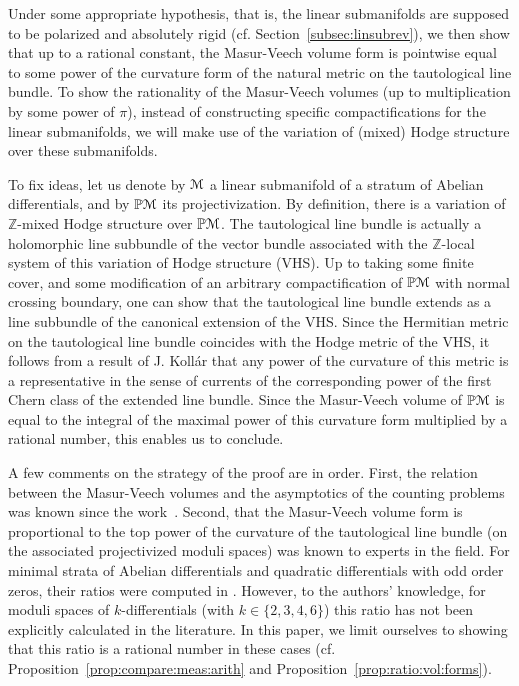 \documentclass[11pt]{article}
\newcommand{\cf}{cf.\xspace}
\numberwithin{equation}{section}
\let\mathcal\EuScript
\theoremstyle{plain}
\theoremstyle{definition}
\newcommand\Z{\mathbb{Z}}
\newcommand{\Pb}{\mathbb{P}}
\newcommand{\cM}{\mathcal{M}}
\begin{document}
Under some appropriate hypothesis, that is, the linear submanifolds are supposed to be polarized and absolutely rigid (\cf Section~\ref{subsec:linsubrev}), we then show that up to a rational constant, the Masur-Veech volume form is pointwise equal to some power of the curvature form of the natural metric on the tautological line bundle.
To show the rationality of the Masur-Veech volumes (up to multiplication by some power of $\pi$), instead of constructing specific compactifications for the linear submanifolds, we will make use of the variation of (mixed) Hodge structure over these submanifolds.

To fix ideas, let us denote by $\cM$ a linear submanifold of a stratum of Abelian differentials, and by $\Pb\cM$ its projectivization.
By definition, there is a variation of $\Z$-mixed Hodge structure over $\Pb\cM$.
The tautological line bundle is actually a holomorphic line subbundle of the vector bundle associated with the $\Z$-local system of this variation of Hodge structure (VHS).
Up to taking some finite cover, and some modification of an arbitrary compactification of $\Pb\cM$ with normal crossing boundary, one can show that the tautological line bundle extends as a line subbundle of the canonical extension of the VHS.
Since the Hermitian metric on the tautological line bundle coincides with the Hodge metric of the VHS, it follows from a result of J. Kollár \cite{Kollar87} that any power of the curvature of this metric is a representative in the sense of currents of the corresponding power of the first Chern class of the extended line bundle. Since the Masur-Veech volume of $\Pb\cM$ is equal to the integral of the maximal power of this curvature form multiplied by a rational number, this enables us to conclude.

A few comments on the strategy of the proof are in order. First, the relation between the Masur-Veech volumes and the asymptotics of the counting problems was known since the work~\cite{EO01}. Second, that the Masur-Veech volume form is proportional to the top power of the curvature of the tautological line bundle (on the associated projectivized moduli spaces) was known to experts in the field.
For minimal strata of Abelian differentials and quadratic differentials with odd order zeros, their ratios were computed in \cite{Sau18, CMS19}.
However, to the authors' knowledge, for moduli spaces of $k$-differentials (with $k\in \{2,3,4,6\}$) this ratio has not been explicitly calculated in the literature.
In this paper, we limit ourselves to showing that this ratio is a rational number in these cases (\cf Proposition~\ref{prop:compare:meas:arith} and Proposition~\ref{prop:ratio:vol:forms}).
\end{document}
